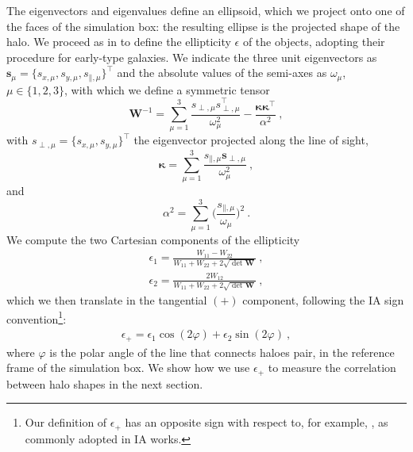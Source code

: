 \documentclass[a4paper,11pt]{article}
\begin{document}
The eigenvectors and eigenvalues define an ellipsoid, which we project onto one of the faces of the simulation box: the resulting ellipse is the projected shape of the halo. We proceed as in \cite{Joachimietal2013b} to define the ellipticity $\epsilon$ of the objects, adopting their procedure for early-type galaxies. We indicate the three unit eigenvectors as $\mathbf{s}_{\mu} = \big \{ s_{x, \mu}, s_{y, \mu}, s_{\mathbin{\|}, \mu}\big \}^\intercal$ and the absolute values of the semi-axes as $\omega_{\mu}$, $\mu \in \{1,2,3\}$, with which we define a symmetric tensor
\begin{equation}
    \mathbf{W}^{-1} = \sum _{\mu=1}^{3} \frac{s_{\perp, \mu} s^\intercal_{\perp, \mu}}{\omega_{\mu}^2} - \frac{\mathbf{\kappa}\mathbf{\kappa}^{\intercal}}{\alpha^2} \ ,
	\label{eq:symtensor}
\end{equation}
with $s_{\perp, \mu} = \big \{ s_{x, \mu}, s_{y, \mu}\big \}^\intercal$ the eigenvector projected along the line of sight, 
\begin{equation}
   \mathbf{\kappa} = \sum_{\mu = 1}^{3} \frac{s_{\mathbin{\|}, \mu} \mathbf{s}_{\perp, \mu}}{\omega_{\mu}^2} \ ,
	\label{eq:kappa}
\end{equation}
and 
\begin{equation}
    \alpha^2=\sum_{\mu = 1}^{3} \bigg( \frac{s_{\mathbin{\|}, \mu}}{\omega_{\mu}} \bigg)^2 \ .
	\label{eq:alpha}
\end{equation}
We compute the two Cartesian components of the ellipticity \cite{BartelmannSchneider2001}
\begin{align}
    	\epsilon_{1} = \frac{W_{11} - W_{22}}{W_{11} + W_{22}+2\sqrt{\det \mathbf{W}}}\ , \\ 
           \epsilon_{2} = \frac{2 W_{12}}{W_{11} + W_{22}+2\sqrt{\det \mathbf{W}}} \ ,
\end{align}
which we then translate in the tangential $(+)$ 
component, following the IA sign convention\footnote{Our definition of $\epsilon_{+}$ has an opposite sign with respect to, for example, \cite{BartelmannSchneider2001}, as commonly adopted in IA works.}:
\begin{align}
	\epsilon_{+} = \epsilon_{1} \cos(2\varphi) + \epsilon_{2} \sin(2\varphi)\ ,%
\end{align}
where $\varphi$ is the polar angle of the line that connects haloes pair, in the reference frame of the simulation box. We show how we use $\epsilon_{+}$ to measure the correlation between halo shapes in the next section.
\end{document}
